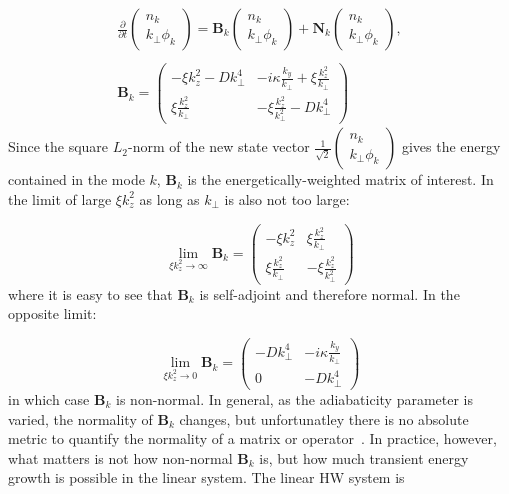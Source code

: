 \documentclass[letter,scriptaddress,twocolumn, prl,showkeys]{revtex4}
\def\beq{\begin{equation}}
\def\eeq{\end{equation}}
\def\beqar{\begin{eqnarray}}
\def\eeqar{\end{eqnarray}}
\begin{document}
\beqar
\label{fourier_en_eqn}
\frac{\partial}{\partial t} \left( \begin{array}{cc} n_k \\ k_\perp \phi_k \end{array} \right) = \mathbf{B}_k \left( \begin{array}{cc} n_k \\ k_\perp \phi_k \end{array} \right) + \mathbf{N}_k \left( \begin{array}{cc} n_k \\ k_\perp \phi_k \end{array} \right), \\ \nonumber \\
\label{B_k}
\mathbf{B}_k = \left( \begin{array}{cc} -\xi k_z^2 - D k_\perp^4 & -i \kappa \frac{k_y}{k_\perp} + \xi \frac{k_z^2}{k_\perp} \\  \xi \frac{k_z^2}{k_\perp} & - \xi \frac{k_z^2}{k_\perp^2} - D k_\perp^4\end{array} \right)
\eeqar
Since the square $L_2$-norm of the new state vector $\frac{1}{\sqrt{2}} \left( \begin{array}{cc} n_k \\ k_\perp \phi_k \end{array} \right)$ gives the energy contained in the mode $k$,
$\mathbf{B}_k$ is the energetically-weighted matrix of interest. In the limit of large $\xi k_z^2$ as long as $k_\perp$ is also not too large:

\beq
\label{B_norm_limit}
\displaystyle\lim_{\xi k_z^2 \to \infty} \mathbf{B}_k = \left( \begin{array}{cc} -\xi k_z^2 & \xi \frac{k_z^2}{k_\perp} \\  \xi \frac{k_z^2}{k_\perp} & - \xi \frac{k_z^2}{k_\perp^2} \end{array} \right)
\eeq
where it is easy to see that $\mathbf{B}_k$ is self-adjoint and therefore normal. In the opposite limit:

\beq
\label{B_norm_limit0}
\displaystyle\lim_{\xi k_z^2 \to 0} \mathbf{B}_k = \left( \begin{array}{cc} - D k_\perp^4 & -i \kappa \frac{k_y}{k_\perp} \\ 0  & - D k_\perp^4\end{array} \right)
\eeq
in which case $\mathbf{B}_k$ is non-normal. In general, as the adiabaticity parameter is varied, the normality of $\mathbf{B}_k$ changes, but unfortunatley there is no absolute metric to quantify
the normality of a matrix or operator~\cite{trefethen2005}. In practice, however, what matters is not how non-normal $\mathbf{B}_k$ is, but how much transient energy growth is possible in the linear
system. The linear HW system is
\end{document}
